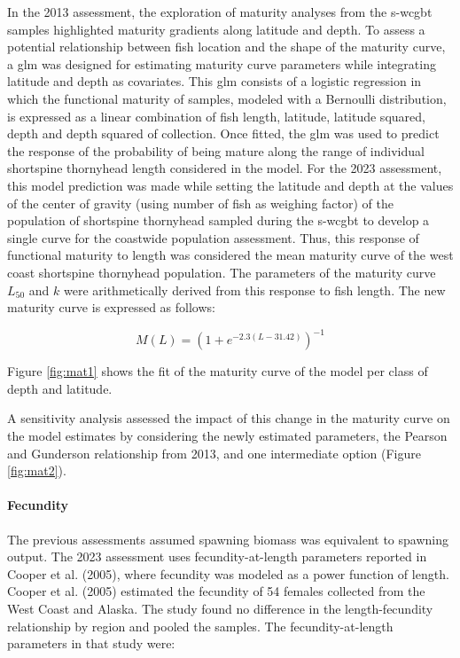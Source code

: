\documentclass[11pt,
  english,
  letterpaper,
]{article}
\begin{document}
In the 2013 assessment, the exploration of maturity analyses from the \gls{s-wcgbt} samples highlighted maturity gradients along latitude and depth. To assess a potential relationship between fish location and the shape of the maturity curve, a \gls{glm} was designed for estimating maturity curve parameters while integrating latitude and depth as covariates. This \gls{glm} consists of a logistic regression in which the functional maturity of samples, modeled with a Bernoulli distribution, is expressed as a linear combination of fish length, latitude, latitude squared, depth and depth squared of collection. Once fitted, the \gls{glm} was used to predict the response of the probability of being mature along the range of individual shortspine thornyhead length considered in the model. For the 2023 assessment, this model prediction was made while setting the latitude and depth at the values of the center of gravity (using number of fish as weighing factor) of the population of shortspine thornyhead sampled during the \gls{s-wcgbt} to develop a single curve for the coastwide population assessment. Thus, this response of functional maturity to length was considered the mean maturity curve of the west coast shortspine thornyhead population. The parameters of the maturity curve \(L_50\) and \(k\) were arithmetically derived from this response to fish length. The new maturity curve is expressed as follows:

\begin{equation} M(L) = (1+e^{-2.3(L-31.42)})^{-1}\end{equation}

Figure \ref{fig:mat1} shows the fit of the maturity curve of the model per class of depth and latitude.

A sensitivity analysis assessed the impact of this change in the maturity curve on the model estimates by considering the newly estimated parameters, the Pearson and Gunderson relationship from 2013, and one intermediate option (Figure \ref{fig:mat2}).

\hypertarget{fecundity}{%
\paragraph{Fecundity}\label{fecundity}}

The previous assessments assumed spawning biomass was equivalent to spawning output. The 2023 assessment uses fecundity-at-length parameters reported in Cooper et al. (2005), where fecundity was modeled as a power function of length. Cooper et al. (2005) estimated the fecundity of 54 females collected from the West Coast and Alaska. The study found no difference in the length-fecundity relationship by region and pooled the samples. The fecundity-at-length parameters in that study were:
\end{document}

